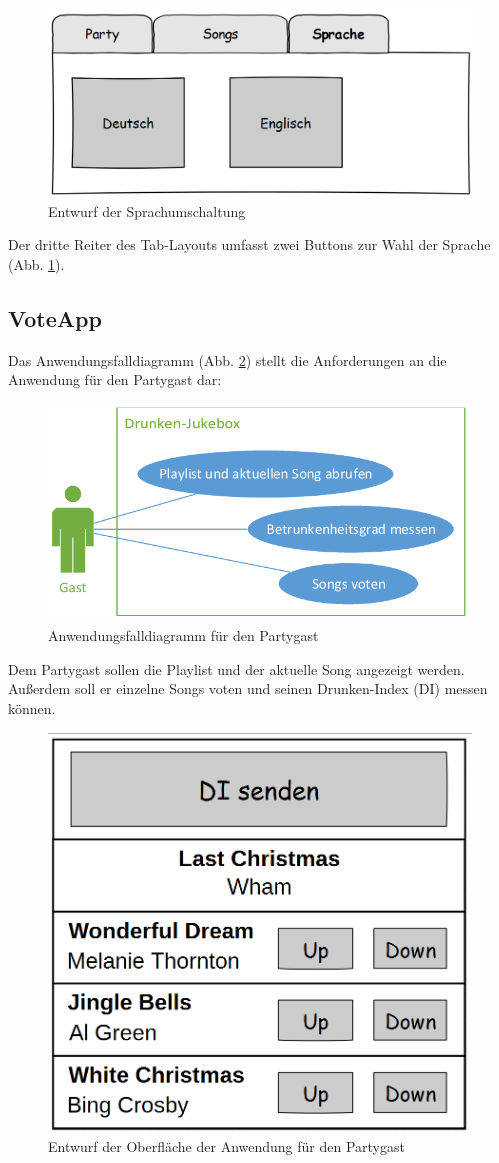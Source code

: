 \begin{figure}[H]
\centering
\includegraphics[width=0.6\linewidth]{Bilder/MockSprachen}
\caption{Entwurf der Sprachumschaltung}
\label{fig:MockSprachen}
\end{figure}

Der dritte Reiter des Tab-Layouts umfasst zwei Buttons zur Wahl der Sprache (Abb. \ref{fig:MockSprachen}).

\subsection{VoteApp}
Das Anwendungsfalldiagramm (Abb. \ref{fig:PartyPeopleUseCase}) stellt die Anforderungen an die Anwendung für den Partygast dar:

\begin{figure}[H]
\centering
\includegraphics[width=0.8\linewidth]{Bilder/PartyPeopleUseCase}
\caption{Anwendungsfalldiagramm für den Partygast\protect\footnotemark}
\label{fig:PartyPeopleUseCase}
\end{figure}

Dem Partygast sollen die Playlist und der aktuelle Song angezeigt werden. Außerdem soll er einzelne Songs voten und seinen Drunken-Index (DI) messen können.

\begin{figure}[H]
\centering
\includegraphics[width=0.45\linewidth]{Bilder/MockPartyPeopleClient}
\caption{Entwurf der Oberfläche der Anwendung für den Partygast}
\label{fig:MockPartyPeopleClient}
\end{figure}

